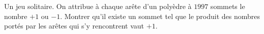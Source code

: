 Un jeu solitaire. On attribue à chaque arête d'un polyèdre à $1997$ sommets le nombre $+1$ ou $-1$. Montrer qu'il existe un sommet tel que le produit des nombres portés par les arêtes qui s'y rencontrent vaut $+1$.
